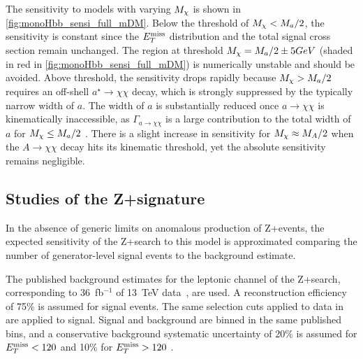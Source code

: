 The sensitivity to models with varying $M_{\chi}$ is shown in  \autoref{fig:monoHbb_sensi_full_mDM}.
Below the threshold of $M_{\chi} < M_{a}/2$, the sensitivity is constant since the $E_T^\mathrm{miss}$ distribution and the total signal cross section remain unchanged.%
The region at threshold $M_{\chi} = M_{a}/2 \pm 5 GeV$ (shaded in red in \autoref{fig:monoHbb_sensi_full_mDM}) is numerically unstable and should be avoided. 
Above threshold, the sensitivity drops rapidly because $M_{\chi} > M_{a}/2$ requires an off-shell $a^{\star} \to \chi\chi$ decay, which is strongly suppressed by the typically narrow width of $a$. 
The width of $a$ is substantially reduced once $a\to \chi \chi$ is kinematically inaccessible, as $\Gamma_{a\to \chi \chi}$ is a large contribution to the total width of $a$ for $M_{\chi} \leq M_{a}/2$ \cite{Bauer:2017ota}.
There is a slight increase in sensitivity for $M_{\chi} \approx M_{A}/2$ when the $A\to \chi\chi$ decay hits its kinematic threshold, yet the absolute sensitivity remains negligible.

\FloatBarrier

\subsection{Studies of the Z+\MET signature}

In the absence of generic limits on anomalous production of Z+\MET events, the expected sensitivity of the Z+\MET search to this model is approximated comparing the number of generator-level signal events to the background estimate. 

The published background estimates for the leptonic channel of the Z+\MET search, corresponding to 36~fb$^{-1}$ of 13~TeV data~\cite{Aaboud:2017bja}, are used. 
A reconstruction efficiency of 75\% is assumed for signal events. 
The same selection cuts applied to data in ~\cite{Aaboud:2017bja} are applied to signal. 
Signal and background are binned in the same published \MET bins, and a conservative background systematic uncertainty of 20\% is assumed for $E_T^\mathrm{miss} < 120$ \GeV and 10\% for $E_T^\mathrm{miss} > 120$ \GeV. 

